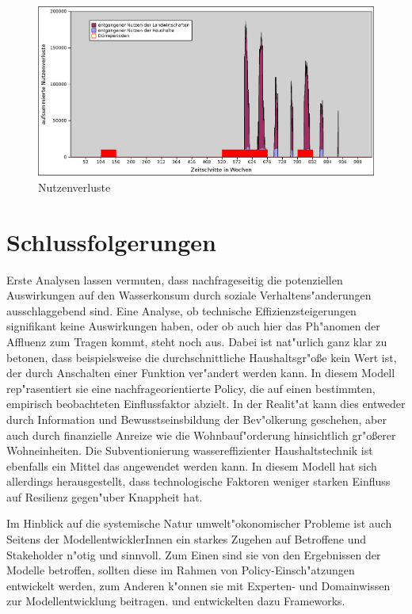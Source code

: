 \documentclass[11pt,a4paper]{article}
\begin{document}
\begin{figure}[h]
\centering
\includegraphics[width=\textwidth]{./utility-losses}
\caption{Nutzenverluste}
\label{fig:utility-losses}
\end{figure}

\newpage

\section{Schlussfolgerungen}
Erste Analysen lassen vermuten, dass nachfrageseitig die potenziellen Aus\-wir\-kungen auf den Wasserkonsum durch soziale Verhaltens"anderungen aus\-schlag\-gebend sind. Eine Analyse, ob technische Effizienzsteigerungen signifikant keine Aus\-wirkungen haben, oder ob auch hier das Ph"anomen der Affluenz zum Tragen kommt, steht noch aus. Dabei ist nat"urlich ganz klar zu betonen, dass beispielsweise die durchschnittliche Haushaltsgr"oße kein Wert ist, der durch Anschalten einer Funktion ver"andert werden kann. In diesem Modell rep"rasentiert sie eine nachfrageorientierte Policy, die auf einen bestimmten, empirisch beobachteten Einflussfaktor abzielt. In der Realit"at kann dies entweder durch Information und Bewusstseinsbildung der Bev"olkerung geschehen, aber auch durch finanzielle Anreize wie die Wohnbauf"orderung hinsichtlich gr"oßerer Wohneinheiten. Die Subventionierung wassereffizienter Haushaltstechnik ist ebenfalls ein Mittel das angewendet werden kann. In diesem Modell hat sich allerdings herausgestellt, dass technologische Faktoren weniger starken Einfluss auf Resilienz gegen"uber Knappheit hat.

Im Hinblick auf die systemische Natur umwelt"okonomischer Probleme ist auch Seitens der ModellentwicklerInnen ein starkes Zugehen auf Betroffene und Stakeholder n"otig und sinnvoll. Zum Einen sind sie von den Ergebnissen der Modelle betroffen, sollten diese im Rahmen von Policy-Einsch"atzungen entwickelt werden, zum Anderen k"onnen sie mit Experten- und Domainwissen zur Modellentwicklung beitragen. \cite{Leenhardt2012} und \cite{Scott2012} entwickelten dazu Frameworks.
\end{document}
